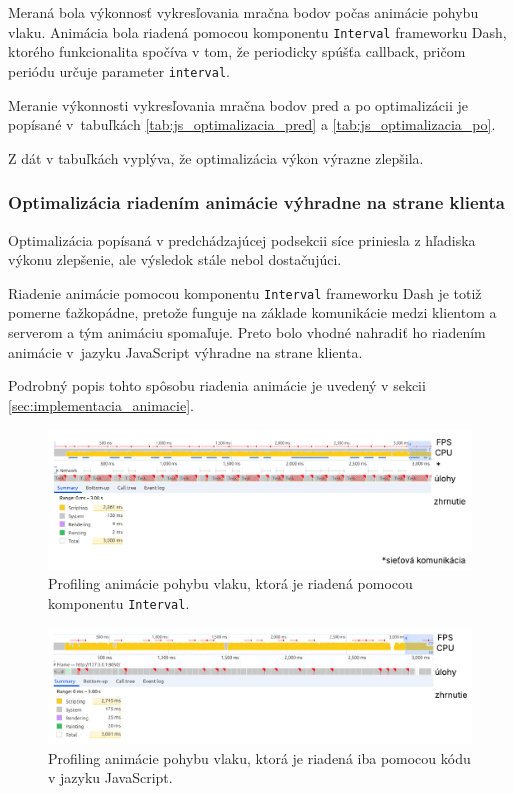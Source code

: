 Meraná bola výkonnosť vykresľovania mračna bodov počas animácie pohybu vlaku. Animácia bola riadená pomocou komponentu \texttt{Interval} frameworku Dash, ktorého funkcionalita spočíva v tom, že periodicky spúšťa callback, pričom periódu určuje parameter \texttt{interval}.

Meranie výkonnosti vykresľovania mračna bodov pred a po optimalizácii je popísané v~tabuľkách \ref{tab:js_optimalizacia_pred} a \ref{tab:js_optimalizacia_po}.

Z dát v tabuľkách vyplýva, že optimalizácia výkon výrazne zlepšila. 

\subsubsection{Optimalizácia riadením animácie výhradne na strane klienta}

Optimalizácia popísaná v predchádzajúcej podsekcii síce priniesla z hľadiska výkonu zlepšenie, ale výsledok stále nebol dostačujúci. 

Riadenie animácie pomocou komponentu \texttt{Interval} frameworku Dash je totiž pomerne ťažkopádne, pretože funguje na základe komunikácie medzi klientom a serverom a tým animáciu spomaľuje. Preto bolo vhodné nahradiť ho riadením animácie v~jazyku JavaScript výhradne na strane klienta.

Podrobný popis tohto spôsobu riadenia animácie je uvedený v sekcii \ref{sec:implementacia_animacie}.

\begin{figure}[h!]
    \centering
    \includegraphics[width=1\linewidth]{text_prace/obrazky-figures/profiling_interval.pdf}
    \caption{Profiling animácie pohybu vlaku, ktorá je riadená pomocou komponentu \texttt{Interval}.}
    \label{fig:profiling_interval}
\end{figure}

\begin{figure}[h!]
    \centering
    \includegraphics[width=1\linewidth]{text_prace/obrazky-figures/profiling1.pdf}
    \caption{Profiling animácie pohybu vlaku, ktorá je riadená iba pomocou kódu v jazyku JavaScript.}
    \label{fig:profiling1}
\end{figure}

